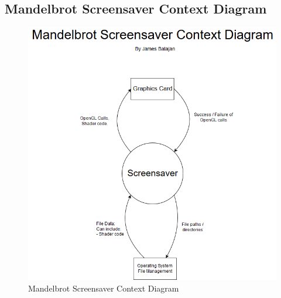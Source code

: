 \documentclass[10pt, openany]{book}
\begin{document}
\subsection{Mandelbrot Screensaver Context Diagram}
\begin{figure}[H]
	\centering
	\includegraphics[width=1.0\linewidth]{Mandelbrot Screensaver Context Diagram}
	\caption{Mandelbrot Screensaver Context Diagram}
	\label{app:mandelbrot-context}
\end{figure}
\newpage
\end{document}
